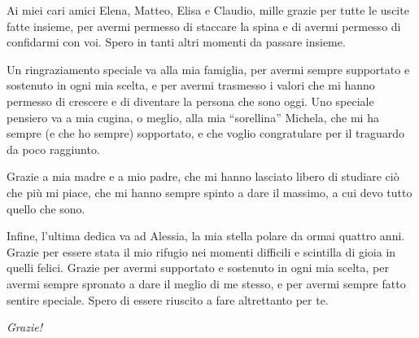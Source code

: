 Ai miei cari amici Elena, Matteo, Elisa e Claudio, mille grazie per tutte le uscite fatte insieme, per avermi permesso di staccare la spina e di avermi permesso di confidarmi con voi. Spero in tanti altri momenti da passare insieme.

Un ringraziamento speciale va alla mia famiglia, per avermi sempre supportato e sostenuto in ogni mia scelta, e per avermi trasmesso i valori che mi hanno permesso di crescere e di diventare la persona che sono oggi. Uno speciale pensiero va a mia cugina, o meglio, alla mia ``sorellina'' Michela, che mi ha sempre (e che ho sempre) sopportato, e che voglio congratulare per il traguardo da poco raggiunto. 

Grazie a mia madre e a mio padre, che mi hanno lasciato libero di studiare ciò che più mi piace, che mi hanno sempre spinto a dare il massimo, a cui devo tutto quello che sono.

Infine, l'ultima dedica va ad Alessia, la mia stella polare da ormai quattro anni. Grazie per essere stata il mio rifugio nei momenti difficili e scintilla di gioia in quelli felici. Grazie per avermi supportato e sostenuto in ogni mia scelta, per avermi sempre spronato a dare il meglio di me stesso, e per avermi sempre fatto sentire speciale. Spero di essere riuscito a fare altrettanto per te.
\vspace{0.5cm}

\noindent \large{\textit{Grazie!}}

